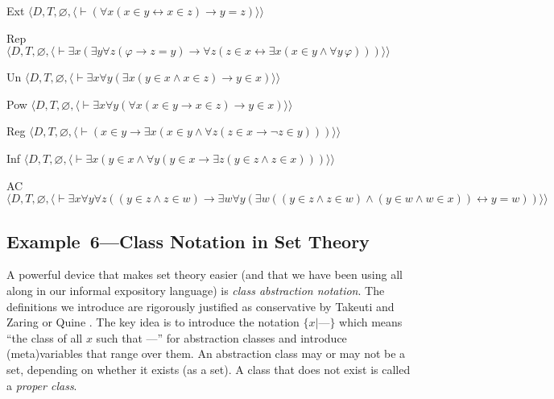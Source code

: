 \begin{list}{}{\itemsep 0.0pt}
      \item[Ext] $\langle D,T,
               \varnothing,
               \langle\vdash (\forall x(x\in y\leftrightarrow x \in z)\to y
               =z) \rangle\rangle$
      \item[Rep] $\langle D,T,
               \varnothing,
               \langle\vdash\exists x ( \exists y \forall z (\varphi \to z = y
                        ) \to
                        \forall z ( z \in x \leftrightarrow \exists x ( x \in
                        y \wedge \forall y\,\varphi ) ) )\rangle\rangle$
      \item[Un] $\langle D,T,
               \varnothing,
               \langle\vdash \exists x \forall y ( \exists x ( y \in x \wedge
               x \in z ) \to y \in x ) \rangle\rangle$
      \item[Pow] $\langle D,T,
               \varnothing,
               \langle\vdash \exists x \forall y ( \forall x ( x \in y \to x
               \in z ) \to y \in x ) \rangle\rangle$
      \item[Reg] $\langle D,T,
               \varnothing,
               \langle\vdash (  x \in y \to
                 \exists x ( x \in y \wedge \forall z ( z \in x \to \lnot z
                \in y ) ) ) \rangle\rangle$
      \item[Inf] $\langle D,T,
               \varnothing,
               \langle\vdash \exists x(y\in x\wedge\forall y(y\in
               x\to
               \exists z(y \in z\wedge z\in x))) \rangle\rangle$
      \item[AC] $\langle D,T,
               \varnothing,
               \langle\vdash \exists x \forall y \forall z ( ( y \in z
               \wedge z \in w ) \to \exists w \forall y ( \exists w
              ( ( y \in z \wedge z \in w ) \wedge ( y \in w \wedge w \in x
              ) ) \leftrightarrow y = w ) ) \rangle\rangle$
\end{list}

\subsection{Example~6---Class Notation in Set Theory}\label{class}

A powerful device that makes set theory easier (and that we have
been using all along in our informal expository language) is {\em class
abstraction notation}.  The
definitions we introduce are rigorously justified
as conservative by Takeuti and Zaring \cite{Takeuti} or
Quine \cite{Quine}.  The key idea is to
introduce the notation $\{x|\mbox{---}\}$ which means ``the class of all $x$
such that ---'' for abstraction classes and introduce (meta)variables that
range over them.  An abstraction class may or may not be a set, depending on
whether it exists (as a set).  A class that does not exist is
called a {\em proper class}.

